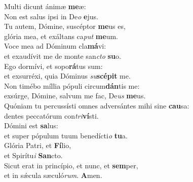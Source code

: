 \evenverse Multi dicunt ánimæ \textbf{me}æ:~\*\\
\evenverse Non est salus ipsi in De\textit{o} \textbf{e}jus.\\
\oddverse Tu autem, Dómine, suscéptor \textbf{me}us es,~\*\\
\oddverse glória mea, et exáltans ca\textit{put} \textbf{me}um.\\
\evenverse Voce mea ad Dóminum cla\textbf{má}vi:~\*\\
\evenverse et exaudívit me de monte san\textit{cto} \textbf{su}o.\\
\oddverse Ego dormívi, et sopo\textbf{rá}tus sum:~\*\\
\oddverse et exsurréxi, quia Dóminus \textit{su}\textbf{scé}\textbf{pit} me.\\
\evenverse Non timébo míllia pópuli circum\textbf{dán}tis me:~\*\\
\evenverse exsúrge, Dómine, salvum me fac, De\textit{us} \textbf{me}us.\\
\oddverse Quóniam tu percussísti omnes adversántes mihi sine \textbf{cau}sa:~\*\\
\oddverse dentes peccatórum con\textit{tri}\textbf{ví}sti.\\
\evenverse Dómini est \textbf{sa}lus:~\*\\
\evenverse et super pópulum tuum benedícti\textit{o} \textbf{tu}a.\\
\oddverse Glória Patri, et \textbf{Fí}lio,~\*\\
\oddverse et Spirítu\textit{i} \textbf{San}cto.\\
\evenverse Sicut erat in princípio, et nunc, et \textbf{sem}per,~\*\\
\evenverse et in sǽcula sæculó\textit{rum}. \textbf{A}men.\\

